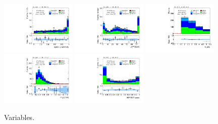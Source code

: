 \begin{figure}[tp]
  \includegraphics[width=0.32\textwidth]{figures/analysis/vbf-topCR/lep-eta-centrality}
  \includegraphics[width=0.32\textwidth]{figures/analysis/vbf-topCR/system-pt}
  \includegraphics[width=0.32\textwidth]{figures/analysis/vbf-topCR/n-jets30}
  \includegraphics[width=0.32\textwidth]{figures/analysis/vbf-topCR/dijet-m-veryhigh}
  \includegraphics[width=0.32\textwidth]{figures/analysis/vbf-topCR/BDTEve-VBF}
  \caption{Variables.}
  \label{fig:backgrounds-topCR-jets}
\end{figure}


